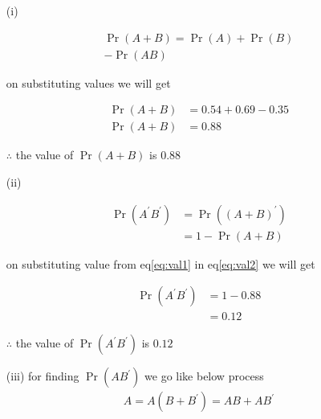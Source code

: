 \documentclass[journal,12pt,twocolumn]{IEEEtran}
\providecommand{\brak}[1]{\ensuremath{\left(#1\right)}}
\providecommand{\pr}[1]{\ensuremath{\Pr\left(#1\right)}}
\begin{document}
\begin{enumerate}



    \item[(i)]
    
           \begin{multline}
                \label{eq:sum}
                      \pr{A+B} = \pr{A} + \pr{B} \\
                      - \pr{A B}
           \end{multline}
          
           on substituting values we will get 
          
           \begin{align}
               \pr{A+B} &= 0.54 + 0.69 - 0.35 \\
               \pr{A+B} &= 0.88
               \label{eq:val1}
           \end{align}
          
          $\therefore$ the value of $\pr{A+B}$ is $0.88$
          
          
          
    \item[(ii)]
    
           \begin{align}
              \pr{A^{\prime} B^{\prime}} &=  \pr{\brak{A+B}^{\prime}}  \\
                                         &=   1 - \pr{A+B}
                                         \label{eq:val2}
           \end{align}  
           
           on substituting value from eq\eqref{eq:val1} in eq\eqref{eq:val2} we will get
           
           \begin{align}
              \pr{A^{\prime} B^{\prime}} &= 1 - 0.88 \\  
                                         &= 0.12
           \end{align}            
           
           $\therefore$ the value of $\pr{A^{\prime} B^{\prime}}$ is $0.12$
           
       
       
    \item[(iii)] for finding $\pr{A B^{\prime}}$ we go like below process  
            \begin{align}
                  A = A \brak{B+B^{\prime}} =  AB + AB^{\prime}
                 \label{eq:axiom_sum_A}
            \end{align}
    

\end{enumerate}
\end{document}
